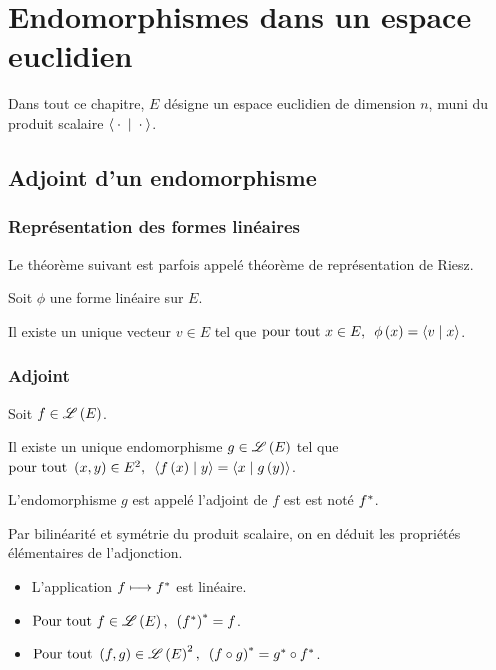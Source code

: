 \chapter{Endomorphismes dans un espace euclidien}

\minitoc

Dans tout ce chapitre, \(E\) désigne un espace euclidien de dimension \(n\), muni du produit scalaire \(\ps{}{}\).

\section{Adjoint d'un endomorphisme}

\subsection{Représentation des formes linéaires}

Le théorème suivant est parfois appelé théorème de représentation de Riesz.

\begin{prop}
Soit \(\phi\) une forme linéaire sur \(E\).

Il existe un unique vecteur \(v\in E\) tel que \(\quantifs{\tpt x\in E}\phi\paren{x}=\ps{v}{x}\).
\end{prop}

\subsection{Adjoint}

\begin{prop}
Soit \(f\in\mathscr{L}\left(E\right)\).

Il existe un unique endomorphisme \(g\in\mathscr{L}\left(E\right)\) tel que \(\quantifs{\tpt\paren{x,y}\in E^2}\ps{f\paren{x}}{y}=\ps{x}{g\paren{y}}\).
\end{prop}

\begin{defi}
L'endomorphisme \(g\) est appelé l'adjoint de \(f\) est est noté \(f^*\).
\end{defi}

Par bilinéarité et symétrie du produit scalaire, on en déduit les propriétés élémentaires de l'adjonction.

\begin{prop}
\begin{itemize}
    \item L'application \(f\longmapsto f^*\) est linéaire. \\
    \item \(\quantifs{\Tpt f\in\Lendo{E}}\paren{f\adj}\adj=f\). \\
    \item \(\quantifs{\Tpt\paren{f,g}\in\Lendo{E}^2}\paren{f\rond g}\adj=g\adj\rond f\adj\).
\end{itemize}
\end{prop}

